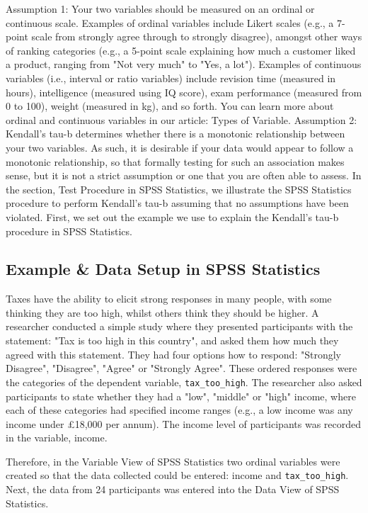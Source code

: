 \documentclass[]{article}
\begin{document}
Assumption 1: Your two variables should be measured on an ordinal or continuous scale. Examples of ordinal variables include Likert scales (e.g., a 7-point scale from strongly agree through to strongly disagree), amongst other ways of ranking categories (e.g., a 5-point scale explaining how much a customer liked a product, ranging from "Not very much" to "Yes, a lot"). Examples of continuous variables (i.e., interval or ratio variables) include revision time (measured in hours), intelligence (measured using IQ score), exam performance (measured from 0 to 100), weight (measured in kg), and so forth. You can learn more about ordinal and continuous variables in our article: Types of Variable.
Assumption 2: Kendall's tau-b determines whether there is a monotonic relationship between your two variables. As such, it is desirable if your data would appear to follow a monotonic relationship, so that formally testing for such an association makes sense, but it is not a strict assumption or one that you are often able to assess.
In the section, Test Procedure in SPSS Statistics, we illustrate the SPSS Statistics procedure to perform Kendall's tau-b assuming that no assumptions have been violated. First, we set out the example we use to explain the Kendall's tau-b procedure in SPSS Statistics.

\subsection{Example \& Data Setup in SPSS Statistics}
Taxes have the ability to elicit strong responses in many people, with some thinking they are too high, whilst others think they should be higher. A researcher conducted a simple study where they presented participants with the statement: "Tax is too high in this country", and asked them how much they agreed with this statement. They had four options how to respond: "Strongly Disagree", "Disagree", "Agree" or "Strongly Agree". These ordered responses were the categories of the dependent variable, \texttt{tax\_too\_high}. The researcher also asked participants to state whether they had a "low", "middle" or "high" income, where each of these categories had specified income ranges (e.g., a low income was any income under £18,000 per annum). The income level of participants was recorded in the variable, income.

Therefore, in the Variable View of SPSS Statistics two ordinal variables were created so that the data collected could be entered: income and \texttt{tax\_too\_high}. Next, the data from 24 participants was entered into the Data View of SPSS Statistics.
\end{document}
